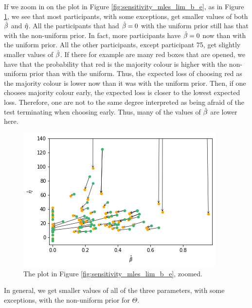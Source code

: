 If we zoom in on the plot in Figure \ref{fig:sensitivity_mles_lim_b_e}, as in Figure \ref{fig:sensitivity_mles_lim_b_e_zoomed}, we see that most participants, with some exceptions, get smaller values of both $\hat{\beta}$ and $\hat{\eta}$. All the participants that had $\hat{\beta}=0$ with the uniform prior still has that with the non-uniform prior. In fact, more participants have $\hat{\beta}=0$ now than with the uniform prior. All the other participants, except participant 75, get slightly smaller values of $\hat{\beta}$.
If there for example are many red boxes that are opened, we have that the probability that red is the majority colour is higher with the non-uniform prior than with the uniform. Thus, the expected loss of choosing red as the majority colour is lower now than it was with the uniform prior. Then, if one chooses majority colour early, the expected loss is closer to the lowest expected loss. Therefore, one are not to the same degree interpreted as being afraid of the test terminating when choosing early. Thus, many of the values of $\hat{\beta}$ are lower here. 
\begin{figure}
    \centering
    \includegraphics[scale=0.8]{pictures/Sensitivity/mles_lim_b_e_zoomed.png}
    \caption[MLEs of $\beta$ and $\eta$, zoomed]{The plot in Figure \ref{fig:sensitivity_mles_lim_b_e}, zoomed.}
    \label{fig:sensitivity_mles_lim_b_e_zoomed}
\end{figure}

In general, we get smaller values of all of the three parameters, with some exceptions, with the non-uniform prior for $\Theta$.

